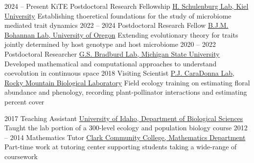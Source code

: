 \documentclass[9pt]{developercv} %
\begin{document}
\vspace{-0 pt}
\begin{entrylist}
	\entry
        {2024 -- Present}
        {KiTE Postdoctoral Research Fellowship}
        {\href{https://evoecogen-kiel.de/}{H. Schulenburg Lab, Kiel University}}
        {Establishing thoeretical foundations for the study of microbiome mediated trait dynamics}
        \entry
        {2022 -- 2024}
        {Postdoctoral Research Fellow}
        {\href{https://pages.uoregon.edu/bohannanlab/}{B.J.M. Bohannan Lab, University of Oregon}}
        {Extending evolutionary theory for traits jointly determined by host genotype and host microbiome}
        \entry
        {2020 -- 2022}
		{Postdoctoral Researcher}
		{\href{http://www.genescape.org/people.html}{G.S. Bradburd Lab, Michigan State University}}
		{Developed mathematical and computational approaches to understand coevolution in continuous space}
        \entry
        {2018}
		{Visiting Scientist}
		{\href{http://paulcaradonna.weebly.com/}{P.J. CaraDonna Lab, Rocky Mountain Biological Laboratory}}
		{Field ecology training on estimating floral abundance and phenology, recording plant-pollinator interactions and estimating percent cover}
\end{entrylist}

\vspace{-5 pt}
\begin{entrylist}
	\entry
        {2017}
		{Teaching Assistant}
		{\href{https://www.uidaho.edu/sci/biology}{University of Idaho, Department of Biological Sciences}}
        {Taught the lab portion of a 300-level ecology and population biology course}
        \entry
        {2012 -- 2014}
		{Mathematics Tutor}
		{\href{https://www.clark.edu/academics/programs/dept/mathematics/}{Clark Community College, Mathematics Department}}
        {Part-time work at tutoring center supporting students taking a wide-range of coursework}
\end{entrylist}
\end{document}
